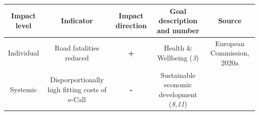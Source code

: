 \documentclass[
]{book}
\begin{document}
\begin{longtable}[]{@{}ccccc@{}}
\toprule
\begin{minipage}[b]{0.17\columnwidth}\centering
Impact level\strut
\end{minipage} & \begin{minipage}[b]{0.16\columnwidth}\centering
Indicator\strut
\end{minipage} & \begin{minipage}[b]{0.17\columnwidth}\centering
Impact direction\strut
\end{minipage} & \begin{minipage}[b]{0.17\columnwidth}\centering
Goal description and number\strut
\end{minipage} & \begin{minipage}[b]{0.17\columnwidth}\centering
Source\strut
\end{minipage}\tabularnewline
\midrule
\endhead
\begin{minipage}[t]{0.17\columnwidth}\centering
Individual\strut
\end{minipage} & \begin{minipage}[t]{0.16\columnwidth}\centering
Road fatalities reduced\strut
\end{minipage} & \begin{minipage}[t]{0.17\columnwidth}\centering
\textbf{+}\strut
\end{minipage} & \begin{minipage}[t]{0.17\columnwidth}\centering
Health \& Wellbeing (\emph{3})\strut
\end{minipage} & \begin{minipage}[t]{0.17\columnwidth}\centering
European Commission, 2020a\strut
\end{minipage}\tabularnewline
\begin{minipage}[t]{0.17\columnwidth}\centering
Systemic\strut
\end{minipage} & \begin{minipage}[t]{0.16\columnwidth}\centering
Disporportionally high fitting costs of e-Call\strut
\end{minipage} & \begin{minipage}[t]{0.17\columnwidth}\centering
\textbf{-}\strut
\end{minipage} & \begin{minipage}[t]{0.17\columnwidth}\centering
Sustainable economic development (\emph{8,11})\strut
\end{minipage} & \begin{minipage}[t]{0.17\columnwidth}\centering

\end{minipage}
\end{longtable}
\end{document}
